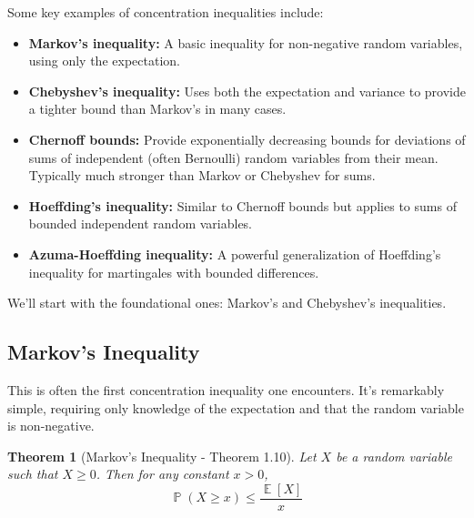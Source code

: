 \documentclass[11pt]{article}
\newtheorem{theorem}{Theorem}[section]
\theoremstyle{definition}
\theoremstyle{remark}
\DeclareMathOperator{\E}{\mathbb{E}} %
\DeclareMathOperator{\Prob}{\mathbb{P}} %
\begin{document}
Some key examples of concentration inequalities include:
\begin{itemize}
    \item \textbf{Markov's inequality:} A basic inequality for non-negative random variables, using only the expectation.
    \item \textbf{Chebyshev's inequality:} Uses both the expectation and variance to provide a tighter bound than Markov's in many cases.
    \item \textbf{Chernoff bounds:} Provide exponentially decreasing bounds for deviations of sums of independent (often Bernoulli) random variables from their mean. Typically much stronger than Markov or Chebyshev for sums.
    \item \textbf{Hoeffding's inequality:} Similar to Chernoff bounds but applies to sums of bounded independent random variables.
    \item \textbf{Azuma-Hoeffding inequality:} A powerful generalization of Hoeffding's inequality for martingales with bounded differences.
\end{itemize}
We'll start with the foundational ones: Markov's and Chebyshev's inequalities.

\subsection{Markov's Inequality}

This is often the first concentration inequality one encounters. It's remarkably simple, requiring only knowledge of the expectation and that the random variable is non-negative.

\begin{theorem}[Markov's Inequality - Theorem 1.10]
Let $X$ be a random variable such that $X \ge 0$. Then for any constant $x > 0$,
\[
\Prob(X \ge x) \le \frac{\E[X]}{x}
\]
\end{theorem}
\end{document}
